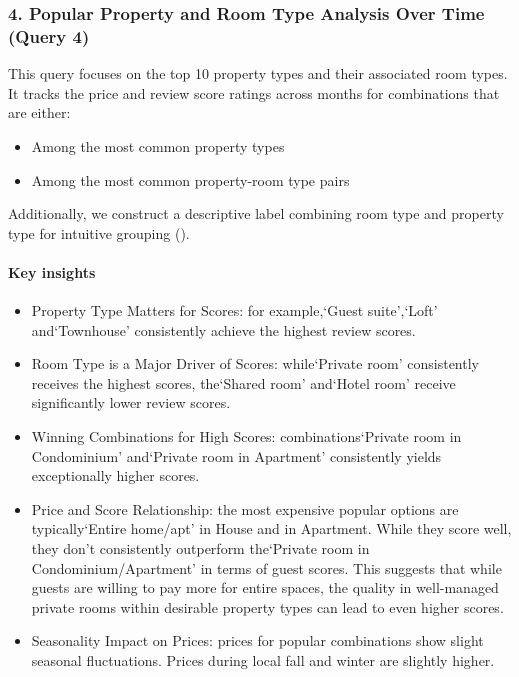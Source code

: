 \subsubsection*{4. Popular Property and Room Type Analysis Over Time (Query 4)}

This query focuses on the top 10 property types and their associated room types. It tracks the price and review score ratings across months for combinations that are either:
\begin{itemize}
    \item Among the most common property types
    \item Among the most common property-room type pairs
\end{itemize}

Additionally, we construct a descriptive label combining room type and property type for intuitive grouping ().

\vspace{0.5em}
\paragraph{Key insights}
\begin{itemize}
    \item Property Type Matters for Scores: for example,`Guest suite',`Loft' and`Townhouse' consistently achieve the highest review scores.
    \item Room Type is a Major Driver of Scores: while`Private room' consistently receives the highest scores, the`Shared room' and`Hotel room' receive significantly lower review scores.
    \item Winning Combinations for High Scores: combinations`Private room in Condominium' and`Private room in Apartment' consistently yields exceptionally higher scores.
    \item Price and Score Relationship: the most expensive popular options are typically`Entire home/apt' in House and in Apartment. While they score well, they don't consistently outperform the`Private room in Condominium/Apartment' in terms of guest scores. This suggests that while guests are willing to pay more for entire spaces, the quality in well-managed private rooms within desirable property types can lead to even higher scores.
    \item Seasonality Impact on Prices: prices for popular combinations show slight seasonal fluctuations. Prices during local fall and winter are slightly higher.

\end{itemize}



